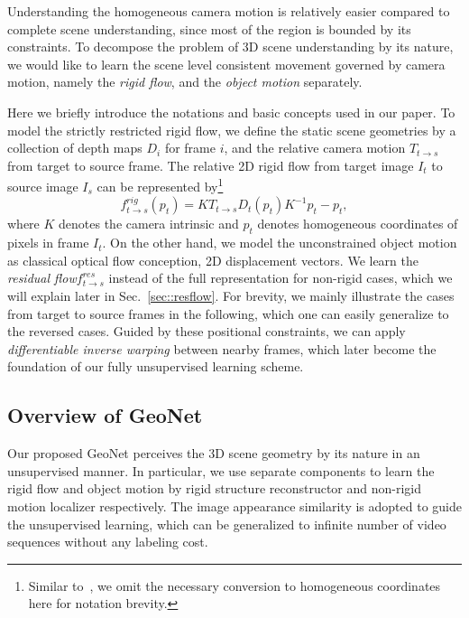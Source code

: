 \documentclass[10pt,twocolumn,letterpaper]{article}
\newcommand{\jpshi}[1]{{{\color{blue} Jianping: #1}}}
\newcommand{\yinzc}[1]{{{\color{cyan} Zhichao: #1}}}
\begin{document}
Understanding the homogeneous camera motion is relatively easier compared to complete scene understanding, since most of the region is bounded by its constraints. %
To decompose the problem of 3D scene understanding by its nature, we would like to learn the scene level consistent movement governed by camera motion, namely the \textit{rigid flow}, and the \textit{object motion} separately. %

Here we briefly introduce the notations and basic concepts used in our paper. To model the strictly restricted rigid flow, we define the static scene geometries by a collection of depth maps $D_i$ for frame $i$, and the relative camera motion $T_{t\to s}$ from target to source frame. The relative 2D rigid flow from target image $I_t$ to source image $I_s$ can be represented by\footnote{Similar to~\cite{zhou2017unsupervised}, we omit the necessary conversion to homogeneous coordinates here for notation brevity.}\begin{equation}
    \label{equa::proj}
f_{t\to s}^{rig}(p_t) = KT_{t\to s}D_t(p_t)K^{-1}p_t - p_t,
\end{equation}
where $K$ denotes the camera intrinsic and $p_t$ denotes homogeneous coordinates of pixels in frame $I_t$. On the other hand, we model the unconstrained object motion as classical optical flow conception, \ie 2D displacement vectors. We learn the \textit{residual flow}$f^{res}_{t\to s}$ instead of the full representation for non-rigid cases, which we will explain later in Sec.~\ref{sec::resflow}. For brevity, we mainly illustrate the cases from target to source frames in the following, which one can easily generalize to the reversed cases. 
Guided by these positional constraints, we can apply \textit{differentiable inverse warping}\cite{JaderbergSZK15} between nearby frames, which later become the foundation of our fully unsupervised learning scheme. 

\subsection{Overview of GeoNet}\label{sec:overview}%

Our proposed GeoNet perceives the 3D scene geometry by its nature in an unsupervised manner. In particular, we use separate components to learn the rigid flow and object motion by rigid structure reconstructor and non-rigid motion localizer respectively. The image appearance similarity is adopted to guide the unsupervised learning, which can be generalized to infinite number of video sequences without any labeling cost.%
\end{document}
